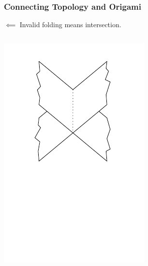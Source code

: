 \documentclass{beamer}
\begin{document}
\begin{frame}
\begin{columns}[c]
\end{columns}
\end{frame}

\begin{frame}
\frametitle{Connecting Topology and Origami}
\begin{block}{$\impliedby$}
Invalid folding means intersection. 
\end{block}
\begin{columns}[c]
\includegraphics[width=.7\textwidth]{knot_pix/finding-ribbon_1.pdf}
\end{columns}
\end{frame}
\end{document}

